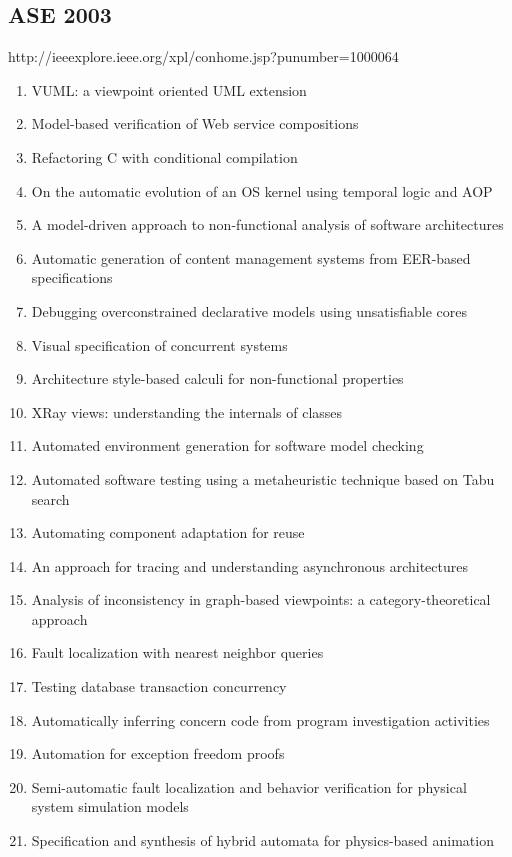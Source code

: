 \subsection{ASE 2003}

http://ieeexplore.ieee.org/xpl/conhome.jsp?punumber=1000064

\begin{enumerate}[itemsep=-1ex]
  \item VUML: a viewpoint oriented UML extension
  \item Model-based verification of Web service compositions
  \item Refactoring C with conditional compilation
  \item On the automatic evolution of an OS kernel using temporal logic and AOP
  \item A model-driven approach to non-functional analysis of software architectures
  \item Automatic generation of content management systems from EER-based specifications
  \item Debugging overconstrained declarative models using unsatisfiable cores
  \item Visual specification of concurrent systems
  \item Architecture style-based calculi for non-functional properties
  \item XRay views: understanding the internals of classes
  \item Automated environment generation for software model checking
  \item Automated software testing using a metaheuristic technique based on Tabu search
  \item Automating component adaptation for reuse
  \item An approach for tracing and understanding asynchronous architectures
  \item Analysis of inconsistency in graph-based viewpoints: a category-theoretical approach
  \item Fault localization with nearest neighbor queries
  \item Testing database transaction concurrency
  \item Automatically inferring concern code from program investigation activities
  \item Automation for exception freedom proofs
  \item Semi-automatic fault localization and behavior verification for physical system simulation models
  \item Specification and synthesis of hybrid automata for physics-based animation

\end{enumerate}
